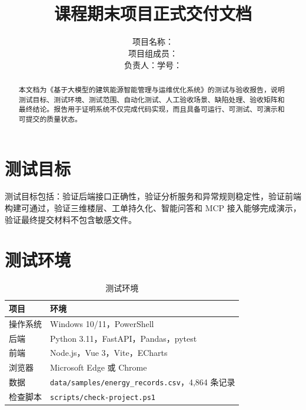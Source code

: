 \documentclass[12pt,a4paper]{ctexart}
\title{
    \vspace{-2em}
    \heiti \zihao{2} \reporttitle \\
    \vspace{1em}
    \zihao{4} 课程期末项目正式交付文档
}
\author{
    \songti \zihao{4}
    项目名称：\projectname \\
    项目组成员：\teamname \\
    负责人：\studentname \quad 学号：\studentid
}
\date{\docdate}
\newcommand{\projectname}{基于大模型的建筑能源智能管理与运维优化系统}
\newcommand{\code}[1]{{\footnotesize\nolinkurl{#1}}}
\begin{document}
\maketitle
\thispagestyle{fancy}

\begin{abstract}
本文档为《\projectname》的测试与验收报告，说明测试目标、测试环境、测试范围、自动化测试、人工验收场景、缺陷处理、验收矩阵和最终结论。报告用于证明系统不仅完成代码实现，而且具备可运行、可测试、可演示和可提交的质量状态。
\end{abstract}

\tableofcontents
\newpage

\section{测试目标}
测试目标包括：验证后端接口正确性，验证分析服务和异常规则稳定性，验证前端构建可通过，验证三维楼层、工单持久化、智能问答和 MCP 接入能够完成演示，验证最终提交材料不包含敏感文件。

\section{测试环境}
\begin{table}[H]
\centering
\caption{测试环境}
\begin{tabularx}{\textwidth}{p{4cm}Y}
\toprule
项目 & 环境 \\
\midrule
操作系统 & Windows 10/11，PowerShell \\
后端 & Python 3.11，FastAPI，Pandas，pytest \\
前端 & Node.js，Vue 3，Vite，ECharts \\
浏览器 & Microsoft Edge 或 Chrome \\
数据 & \code{data/samples/energy_records.csv}，4,864 条记录 \\
检查脚本 & \code{scripts/check-project.ps1} \\
\bottomrule
\end{tabularx}
\end{table}
\end{document}
